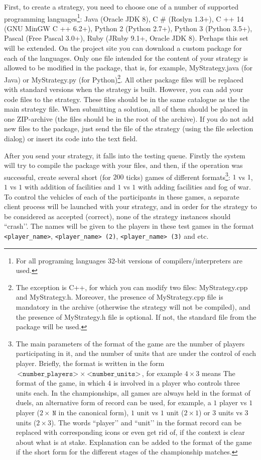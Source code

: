 First, to create a strategy, you need to choose one of a number of supported programming languages\footnote [4] {For all programing languages
32-bit versions of compilers/interpreters are used.}: Java (Oracle JDK 8), C \# (Roslyn 1.3+), C ++ 14 (GNU MinGW C ++
6.2+), Python 2 (Python 2.7+), Python 3 (Python 3.5+), Pascal (Free Pascal 3.0+), Ruby (JRuby 9.1+, Oracle JDK 8). Perhaps this set
will be extended. On the project site you can download a custom package for each of the languages. Only one file intended for the content of your strategy is allowed to be modified in the package,
that is, for example, MyStrategy.java (for Java) or MyStrategy.py (for
Python)\footnote [5]{The exception is C++, for which you can modify two files: MyStrategy.cpp and MyStrategy.h. Moreover, the presence of
MyStrategy.cpp file is mandatory in the archive (otherwise the strategy will not be compiled), and the presence of MyStrategy.h file is optional.
 If not, the standard file from the package will be used.}. All other package files will be replaced with standard versions when the strategy is built. However, you can add your code files to the strategy. These files should be in the same catalogue as the
the main strategy file. When submitting a solution, all of them should be placed in one ZIP-archive (the files should be in the root of the archive). If
you do not add new files to the package, just send the file of the strategy (using the file selection dialog) or insert its code into the text field.

After you send your strategy, it falls into the testing queue. Firstly the system will try to compile the package with your
files, and then, if the operation was successful, create several short (for $200$ ticks) games of different formats\footnote [6]{The main
parameters of the format of the game are the number of players participating in it, and the number of units that are under the control of each player.
Briefly, the format is written in the form $\texttt{<number\_players>}~\times~\texttt{<number\_units>}$, for example $4\times3$ means
The format of the game, in which $4$ is involved in a player who controls three units each. In the championships, all games are always held in the format
of duels, an alternative form of record can be used, for example, a $1$ player vs $1$ player ($2\times~\texttt{N}$ in the canonical form), $1$
unit vs $1$ unit ($2\times1$) or $3$ units vs $3$ units ($2\times3$). The words ``player’’ and ``unit’’ in the format record can be replaced
with corresponding icons or even get rid of, if the context is clear about what is at stake. Explanation can be added to the format of the game
if the short form for the different stages of the championship matches.}: $1$ vs $1$, $1$ vs $1$ with addition of facilities and $1$ vs $1$ with
adding facilities and fog of war. To control the vehicles of each of the participants in these games, a separate client process will be launched with
your strategy, and in order for the strategy to be considered as accepted (correct), none of the strategy instances should ``crash’’.
The names will be given to the players in these test games in the format \texttt{<player\_name>}, \texttt{<player\_name> (2)}, \texttt{<player\_name> (3)} and
etc.

